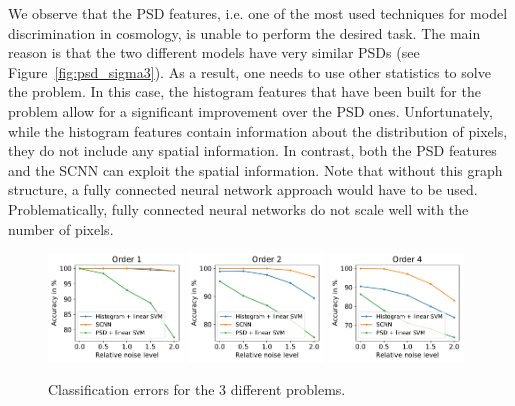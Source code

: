 \documentclass[final,twocolumn,3p,times,authoryear]{elsarticle}
\newcommand{\figref}[1]{Figure~\ref{fig:#1}}
\newcommand{\1}{\b{1}}              %
\newcommand{\0}{\b{0}}              %
\begin{document}
We observe that the PSD features, i.e.
one of the most used techniques for model discrimination in cosmology, is unable
to perform the desired task. The main reason is that the two different models
have very similar PSDs (see \figref{psd_sigma3}). As a result, one
needs to use other statistics to solve the problem. In this case, the
histogram features that have been built for the problem allow for a significant improvement over the PSD ones.
Unfortunately, while the histogram features contain information about the
distribution of pixels, they do not include any spatial information. In
contrast, both the PSD features and the SCNN can exploit the spatial
information.
Note that without this graph structure, a fully connected neural network approach would have to be used. Problematically, fully connected neural networks do not scale well with the number of pixels.




\begin{figure}[!ht]
\centering
\includegraphics[width=0.32\textwidth]{figures/result_order1.pdf}
\includegraphics[width=0.32\textwidth]{figures/result_order2.pdf}
\includegraphics[width=0.32\textwidth]{figures/result_order4.pdf}
\caption{Classification errors for the 3 different problems.}
\label{fig:results}
\end{figure}
\end{document}

